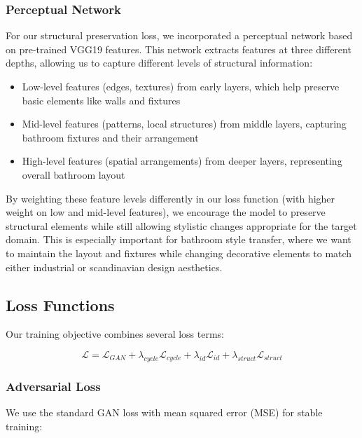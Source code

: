 \documentclass[twocolumn,superscriptaddress,aps]{revtex4-1}
\begin{document}
\subsubsection{Perceptual Network}

For our structural preservation loss, we incorporated a perceptual network based on pre-trained VGG19 features. This network extracts features at three different depths, allowing us to capture different levels of structural information:

\begin{itemize}
    \item Low-level features (edges, textures) from early layers, which help preserve basic elements like walls and fixtures
    \item Mid-level features (patterns, local structures) from middle layers, capturing bathroom fixtures and their arrangement
    \item High-level features (spatial arrangements) from deeper layers, representing overall bathroom layout
\end{itemize}

By weighting these feature levels differently in our loss function (with higher weight on low and mid-level features), we encourage the model to preserve structural elements while still allowing stylistic changes appropriate for the target domain. This is especially important for bathroom style transfer, where we want to maintain the layout and fixtures while changing decorative elements to match either industrial or scandinavian design aesthetics.

\subsection{Loss Functions}

Our training objective combines several loss terms:

\begin{equation}
\mathcal{L} = \mathcal{L}_{GAN} + \lambda_{cycle}\mathcal{L}_{cycle} + \lambda_{id}\mathcal{L}_{id} + \lambda_{struct}\mathcal{L}_{struct}
\end{equation}

\subsubsection{Adversarial Loss}

We use the standard GAN loss with mean squared error (MSE) for stable training:
\end{document}
